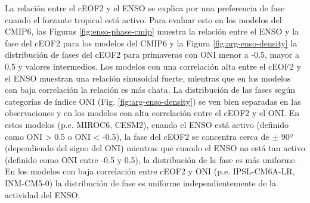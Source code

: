 \documentclass[12pt,oneside,a4paper]{reedthesis}
\begin{document}
La relación entre el cEOF2 y el ENSO se explica por una preferencia de fase cuando el forzante tropical está activo.
Para evaluar esto en los modelos del CMIP6, las Figuras \ref{fig:enso-phase-cmip} muestra la relación entre el ENSO y la fase del cEOF2 para los modelos del CMIP6 y la Figura \ref{fig:arg-enso-density} la distribución de fases del cEOF2 para primaveras con ONI menor a -0.5, mayor a 0.5 y valores intermedios.
Los modelos con una correlación alta entre el cEOF2 y el ENSO muestran una relación sinusoidal fuerte, mientras que en los modelos con baja correlación la relación es más chata.
La distribución de las fases según categorías de índice ONI (Fig. \ref{fig:arg-enso-density}) se ven bien separadas en las observaciones y en los modelos con alta correlación entre el cEOF2 y el ONI.
En estos modelos (p.e. MIROC6, CESM2), cuando el ENSO está activo (definido como ONI \textgreater{} 0.5 o ONI \textless{} -0.5), la fase del cEOF2 se concentra cerca de \(\pm\) 90º (dependiendo del signo del ONI) mientras que cuando el ENSO no está tan activo (definido como ONI entre -0.5 y 0.5), la distribución de la fase es más uniforme.
En los modelos con baja correlación entre cEOF2 y ONI (p.e. IPSL-CM6A-LR, INM-CM5-0) la distribución de fase es uniforme independientemente de la actividad del ENSO.
\end{document}
